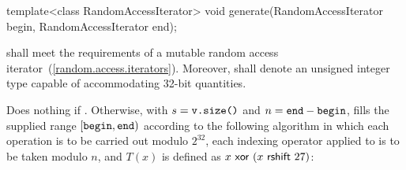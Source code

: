 %
\begin{itemdecl}
template<class RandomAccessIterator>
  void generate(RandomAccessIterator begin, RandomAccessIterator end);
\end{itemdecl}

\begin{itemdescr}
\pnum\requires {}
  shall meet the requirements of a mutable random access iterator~(\ref{random.access.iterators}).
  Moreover,
  shall denote an unsigned integer type
  capable of accommodating 32-bit quantities.

\pnum\effects
 Does nothing if .
 Otherwise,
 with $ s = \texttt{v.size()} $
 and  $ n = \texttt{end} - \texttt{begin} $,
 fills the supplied range $[\texttt{begin},\texttt{end})$
 according to the following algorithm
 in which
 each operation is to be carried out modulo $2^{32}$,
 each indexing operator applied to  is to be taken modulo $n$,
 and $T(x)$ is defined as $ x \, \, \mathsf{xor} \, \, (x \, \, \mathsf{rshift} \, \, 27)$:


\end{itemdescr}
